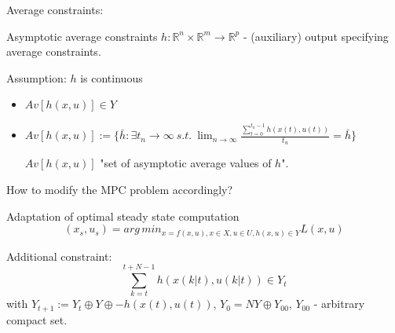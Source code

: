 Average constraints:

\begin{Definition}
Asymptotic average constraints $h: \mathbb{R}^n \times \mathbb{R}^m \to \mathbb{R}^p$ - (auxiliary) output specifying average constraints.
\end{Definition}

Assumption: $h$ is continuous
\begin{itemize}
\item $Av[h(x,u)] \in Y$
\item $Av[h(x,u)] := \{ \bar{h}: \exists {t_n} \to \infty \ s.t. \ \lim_{n \to \infty} \frac{\sum_{t=0}^{t_n - 1}h(x(t),u(t))}{t_n}  = \bar{h}\}$

$Av[h(x,u)]$ "set of asymptotic average values of $h$".
\end{itemize}

How to modify the MPC problem accordingly?

Adaptation of optimal steady state computation
\begin{equation*}
(x_s,u_s) = arg\,min_{x = f(x,u), x \in X, u \in U, h(x,u) \in Y} L(x,u)
\end{equation*}

Additional constraint:
\begin{equation*}
\sum_{k=t}^{t+N-1}h(x(k|t),u(k|t)) \in Y_t
\end{equation*}
with $Y_{t+1} := Y_t \oplus Y \oplus {-h(x(t),u(t))}$, $Y_0 = NY \oplus Y_{00}$, $Y_{00}$ - arbitrary compact set.


